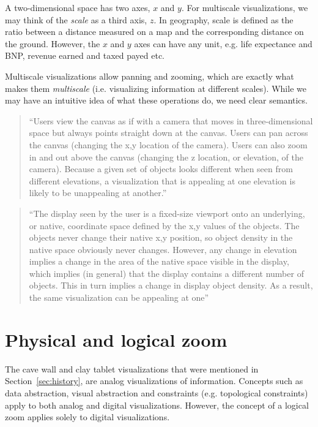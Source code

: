 \documentclass[11pt, oneside]{report}   	%
\begin{document}
A two-dimensional space has two axes, $x$ and $y$. For multiscale visualizations, we may think of the \emph{scale} as a third axis, $z$. In geography, scale is defined as the ratio between a distance measured on a map and the corresponding distance on the ground. However, the $x$ and $y$ axes can have any unit, e.g. life expectance and BNP, revenue earned and taxed payed etc.

Multiscale visualizations allow panning and zooming, which are exactly what makes them \emph{multiscale} (i.e. visualizing information at different scales).  While we may have an intuitive idea of what these operations do, we need clear semantics.

\begin{quote}
``Users view the canvas as if with a camera that moves in three-dimensional space but always points straight down at the canvas. Users can pan across the canvas (changing the x,y location of the camera). Users can also zoom in and out above the canvas (changing the z location, or elevation, of the camera). Because a given set of objects looks different when seen from different elevations, a visualization that is appealing at one elevation is likely to be unappealing at another.''~\cite{woodruff1998constant}
\end{quote}

\begin{quote}
``The display seen by the user is a fixed-size viewport onto an underlying, or native, coordinate space defined by the x,y values of the objects. The objects never change their native x,y position, so object density in the native space obviously never changes. However, any change in elevation implies a change in the area of the native space visible in the display, which implies (in general) that the display contains a different number of objects. This in turn implies a change in display object density. As a result, the same visualization can be appealing at one''
\end{quote}

\section{Physical and logical zoom}

The cave wall and clay tablet visualizations that were mentioned in Section~\ref{sec:history}, are analog visualizations of information. Concepts such as data abstraction, visual abstraction and constraints (e.g. topological constraints) apply to both analog and digital visualizations. However, the concept of a logical zoom applies solely to digital visualizations. 
\end{document}
